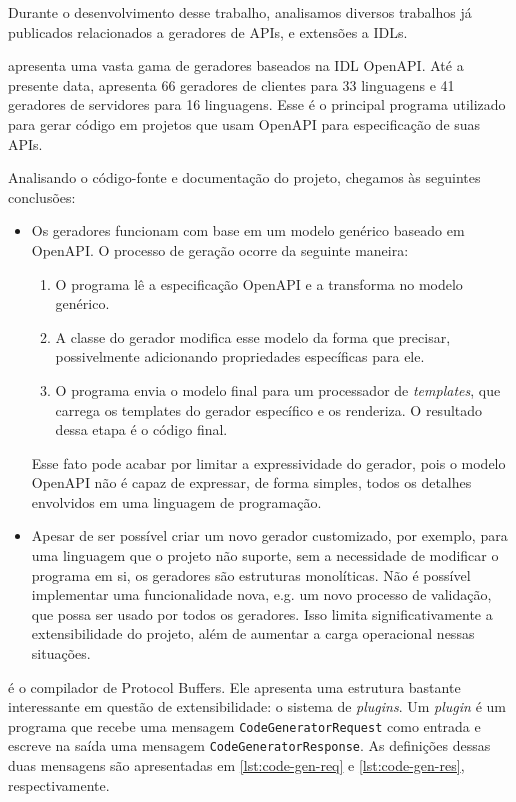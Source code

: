
Durante o desenvolvimento desse trabalho, analisamos diversos trabalhos já publicados
relacionados a geradores de APIs, e extensões a IDLs.

\cite{openapi:gen} apresenta uma vasta gama de geradores baseados na IDL OpenAPI. Até
a presente data, apresenta 66 geradores de clientes para 33 linguagens e 41 geradores
de servidores para 16 linguagens. Esse é o principal programa utilizado para gerar
código em projetos que usam OpenAPI para especificação de suas APIs.

Analisando o código-fonte e documentação do projeto, chegamos às seguintes conclusões:

\begin{itemize}
\item
  Os geradores funcionam com base em um modelo genérico baseado em OpenAPI. O processo
  de geração ocorre da seguinte maneira:

  \begin{enumerate}
  \item
    O programa lê a especificação OpenAPI e a transforma no modelo genérico.
  \item
    A classe do gerador modifica esse modelo da forma que precisar, possivelmente
    adicionando propriedades específicas para ele.
  \item
    O programa envia o modelo final para um processador de \textit{templates}, que
    carrega os templates do gerador específico e os renderiza. O resultado dessa
    etapa é o código final.
  \end{enumerate}

  Esse fato pode acabar por limitar a expressividade do gerador, pois o modelo
  OpenAPI não é capaz de expressar, de forma simples, todos os detalhes envolvidos
  em uma linguagem de programação.
\item
  Apesar de ser possível criar um novo gerador customizado, por exemplo, para uma
  linguagem que o projeto não suporte, sem a necessidade de modificar o programa
  em si, os geradores são estruturas monolíticas. Não é possível implementar uma
  funcionalidade nova, e.g. um novo processo de validação, que possa ser usado por
  todos os geradores. Isso limita significativamente a extensibilidade do projeto,
  além de aumentar a carga operacional nessas situações.
\end{itemize}

\cite{googl:protobuf} é o compilador de Protocol Buffers. Ele apresenta uma estrutura
bastante interessante em questão de extensibilidade: o sistema de \textit{plugins}.
Um \textit{plugin} é um programa que recebe uma mensagem \texttt{CodeGeneratorRequest}
como entrada e escreve na saída uma mensagem \texttt{CodeGeneratorResponse}. As
definições dessas duas mensagens são apresentadas em \cref{lst:code-gen-req} e
\cref{lst:code-gen-res}, respectivamente.

